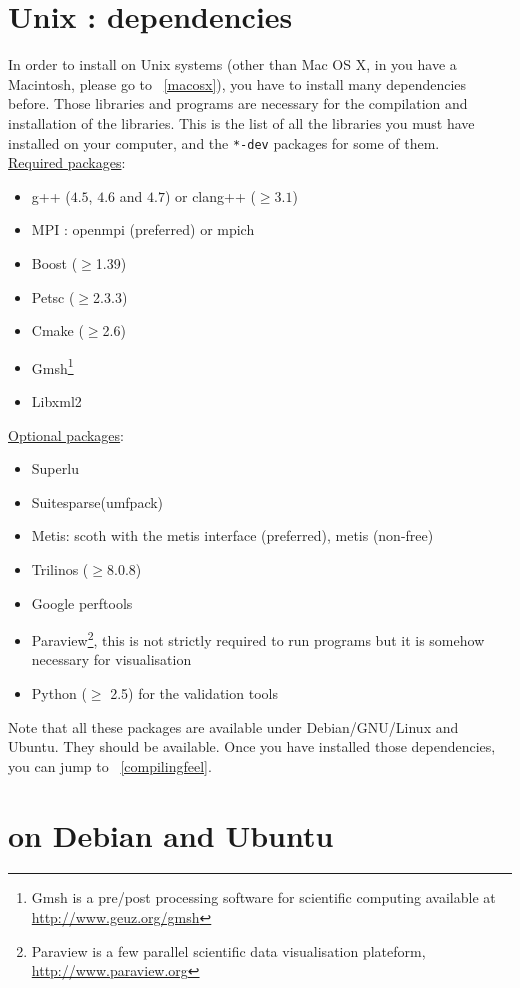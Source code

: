 \section{Unix : dependencies}
\label{sec:about-dependencies}

In order to install \feel on Unix systems (other than Mac OS X, in you have a Macintosh, please go to ~\ref{macosx}), you have to install many dependencies
before. Those libraries and programs are necessary for the
compilation and installation of the \feel libraries.
This is the list of all the libraries you must have installed on your
computer, and the \lstinline|*-dev| packages for some of them. \\
\underline{Required packages}:
\begin{itemize}
\item g++ ($4.5$, $4.6$ and $4.7$) or clang++ ($\geqslant 3.1$)
\item MPI : openmpi (preferred) or mpich
\item Boost ($\geq$1.39)
\item Petsc ($\geq$2.3.3)
\item Cmake ($\geq$2.6)
\item Gmsh\footnote{Gmsh is a pre/post processing software for scientific
computing available at \url{http://www.geuz.org/gmsh}}
\item Libxml2
\end{itemize}
\underline{Optional packages}:
\begin{itemize}
\item Superlu
\item Suitesparse(umfpack)
\item Metis: scoth with the metis interface (preferred), metis (non-free)
\item Trilinos ($\geq$8.0.8)
\item Google perftools
\item Paraview\footnote{Paraview is a few parallel scientific data
    visualisation plateform, \url{http://www.paraview.org}}, this is
  not strictly required to run \feel programs but it is somehow
  necessary for visualisation
\item Python ($\geq$ 2.5) for the validation tools
\end{itemize}
Note that all these packages are available under Debian/GNU/Linux and
Ubuntu. They should be available. Once you have installed those dependencies, you can jump to ~\ref{compilingfeel}.

\section{\feel on Debian and Ubuntu}
\label{sec:feel-debian-ubuntu}

